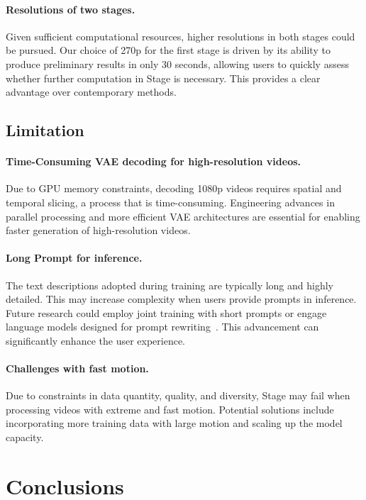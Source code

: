 \paragraph{Resolutions of two stages.} Given sufficient computational resources, higher resolutions in both stages could be pursued. Our choice of 270p for the first stage is driven by its ability to produce preliminary results in only 30 seconds, allowing users to quickly assess whether further computation in Stage  is necessary. This provides a clear advantage over contemporary methods.


\subsection{Limitation}



\paragraph{Time-Consuming VAE decoding for high-resolution videos.} Due to GPU memory constraints, decoding 1080p videos requires spatial and temporal slicing, a process that is time-consuming. Engineering advances in parallel processing and more efficient VAE architectures are essential for enabling faster generation of high-resolution videos.

\paragraph{Long Prompt for inference.} The text descriptions adopted during training are typically long and highly detailed. This may increase complexity when users provide prompts in inference. Future research could employ joint training with short prompts or engage language models designed for prompt rewriting~\citep{ji2024prompt}. This advancement can significantly enhance the user experience.

\paragraph{Challenges with fast motion.} Due to constraints in data quantity, quality, and diversity, Stage  may fail when processing videos with extreme and fast motion. Potential solutions include incorporating more training data with large motion and scaling up the model capacity.


\section{Conclusions}


